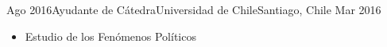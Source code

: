 \begin{experiences}
  \emptySeparator 
  \experience 
    {Ago 2016}{Ayudante de Cátedra}{Universidad de Chile}{Santiago, Chile} {Mar 2016}
    {\begin{itemize}
    \item Estudio de los Fenómenos Políticos
    \end{itemize}}
    {}
\end{experiences}
